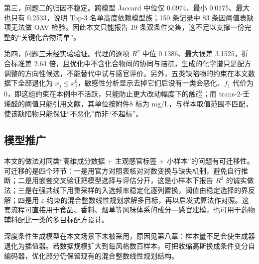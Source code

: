 第三，问题二的归因不稳定。跨模型 Jaccard 中位仅 0.0974、最小 0.0175、最大也只有 0.2533，说明 Top-3 名单高度依赖模型族；150 条记录中 83 条因阈值表缺项无法做 OAV 检验。因此本文只能报告 19 条双条件交集，这不足以支撑一份完整的“关键化合物清单”。

第四，问题三未经实验验证。代理的逐项 $R^2$ 中位 0.1386、最大误差 3.1525，折合标准差 2.64 倍，且优化中不含化合物间的协同与拮抗，生成的化学谱只是配方调整的方向性候选，不能替代中试与感官评价。另外，五类缺陷物的约束在本文数据下全部退化为 $x_j\leq x^0_j$，敏感性分析显示去掉它们后没有一类会恶化、$f_1$ 代价为 0，即这组约束在本例中不活跃，只能防止更大改动幅度下的触碰；而 trans-2-壬烯醛的阈值只能引用文献，其单位按附件8 标为 mg/L，与样本取值范围不匹配，使该缺陷物只能保证“不恶化”而非“不超标”。

\subsection{模型推广}

本文的做法对同类“高维成分数据 + 主观感官标签 + 小样本”的问题有可迁移性。可迁移的是四个环节：一是用官方对照表核对对数变换与缺失机制，避免自行推断；二是用嵌套交叉验证把模型选择与评估分开，这是小样本下报告 $R^2$ 的诚实做法；三是在强共线下用重采样的入选频率稳定化逐列置换，阈值由稳定选择的界反解；四是用 $\varepsilon$-约束的混合整数线性规划求解多目标，再以启发式算法作对照。这套流程可直接用于食品、香料、烟草等风味体系的成分—感官建模，也可用于药物辅料配比一类的多目标配方设计。

深度条件生成模型在本文场景下未被采用，原因见第八章：样本量不足会使生成器退化为插值器。若数据规模扩大到每风格数百样本，可把收缩高斯换成条件变分自编码器，优化部分仍保留现有的混合整数线性规划结构。
